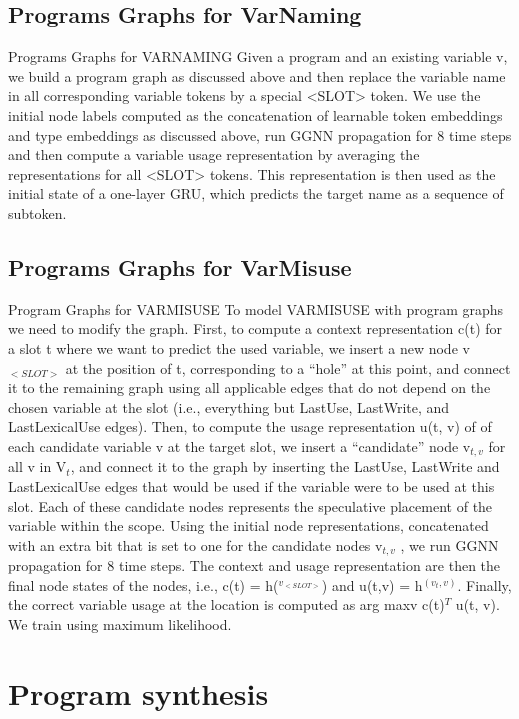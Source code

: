 \documentclass{article}
\begin{document}
\subsection{Programs Graphs for VarNaming}
Programs Graphs for VARNAMING Given a program and an existing variable v, we build a program graph as discussed above and then replace the variable name in all corresponding variable tokens by a special <SLOT> token. We use the initial node labels computed as the concatenation of learnable token embeddings and type embeddings as discussed above, run GGNN propagation for 8 time steps and then compute a variable usage representation by averaging the representations for all <SLOT> tokens. This representation is then used as the initial state of a one-layer GRU, which predicts the target name as a sequence of subtoken.

\subsection{Programs Graphs for VarMisuse}
Program Graphs for VARMISUSE To model VARMISUSE with program graphs we need to modify the graph. First, to compute a context representation c(t) for a slot t where we want to predict the used variable, we insert a new node v$_{<SLOT>}$ at the position of t, corresponding to a “hole” at this point, and connect it to the remaining graph using all applicable edges that do not depend on the chosen variable at the slot (i.e., everything but LastUse, LastWrite, and LastLexicalUse edges). Then, to compute the usage representation u(t, v) of of each candidate variable v at the target slot, we insert a “candidate” node v$_{t,v}$ for all v in V$_t$, and connect it to the graph by inserting the LastUse, LastWrite and LastLexicalUse edges that would be used if the variable were to be used at this slot. Each of these candidate nodes represents the speculative placement of the variable within the scope.
Using the initial node representations, concatenated with an extra bit that is set to one for the candidate nodes v$_{t,v}$ , we run GGNN propagation for 8 time steps. The context and usage representation are then the final node states of the nodes, i.e., c(t) = h($^{v_{<SLOT>}}$) and u(t,v) = h$^{(v_t,v)}$. Finally, the correct variable usage at the location is computed as arg maxv c(t)$^T$ u(t, v). We train using maximum likelihood.

\section{Program synthesis}
\end{document}

